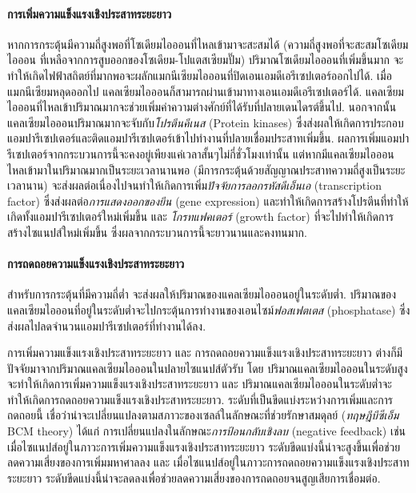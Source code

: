 {\begin{shaded}
\paragraph{\small การเพิ่มความแข็งแรงเชิงประสาทระยะยาว}
หากการกระตุ้นมีความถี่สูงพอที่โซเดียมไอออนที่ไหลเข้ามาจะสะสมได้ (ความถี่สูงพอที่จะสะสมโซเดียมไอออน ที่เหลือจากการสูบออกของโซเดียม-โปแตสเซียมปั๊ม)
ปริมาณโซเดียมไอออนที่เพิ่มขึ้นมาก จะทำให้เกิดไฟฟ้าสถิตย์ที่มากพอจะผลักแมกนีเซียมไอออนที่ปิดเอนเอมดีเอรีเซปเตอร์ออกไปได้.
เมื่อแมกนีเซียมหลุดออกไป แคลเซียมไอออนก็สามารถผ่านเข้ามาทางเอนเอมดีเอรีเซปเตอร์ได้.
แคลเซียมไอออนที่ไหลเข้าปริมาณมากจะช่วยเพิ่มค่าความต่างศักย์ที่ได้รับที่ปลายเดนไดรต์ขึ้นไป.
นอกจากนั้นแคลเซียมไอออนปริมาณมากจะจับกับ\textit{โปรตีนคีเนส} (Protein kinases) ซึ่งส่งผลให้เกิดการประกอบแอมปารีเซปเตอร์และติดแอมปารีเซปเตอร์เข้าไปทำงานที่ปลายเชื่อมประสาทเพิ่มขึ้น.
ผลการเพิ่มแอมปารีเซปเตอร์จากกระบวนการนี้จะคงอยู่เพียงแค่เวลาสั้นๆไม่กี่ชั่วโมงเท่านั้น
แต่หากมีแคลเซียมไอออนไหลเข้ามาในปริมาณมากเป็นระยะเวลานานพอ (มีการกระตุ้นด้วยสัญญาณประสาทความถี่สูงเป็นระยะเวลานาน) จะส่งผลต่อเนื่องไปจนทำให้เกิดการเพิ่ม\textit{ปัจจัยการลอกรหัสดีเอ็นเอ} (transcription factor) ซึ่งส่งผลต่อ\textit{การแสดงออกของยีน} (gene expression) และทำให้เกิดการสร้างโปรตีนที่ทำให้เกิดทั้งแอมปารีเซปเตอร์ใหม่เพิ่มขึ้น และ \textit{โกรทแฟคเตอร์} (growth factor) ที่จะไปทำให้เกิดการสร้างไซแนปส์ใหม่เพิ่มขึ้น ซึ่งผลจากกระบวนการนี้จะยาวนานและคงทนมาก.

\paragraph{\small การถดถอยความแข็งแรงเชิงประสาทระยะยาว}
สำหรับการกระตุ้นที่มีความถี่ต่ำ จะส่งผลให้ปริมาณของแคลเซียมไอออนอยู่ในระดับต่ำ.
ปริมาณของแคลเซียมไอออนที่อยู่ในระดับต่ำจะไปกระตุ้นการทำงานของเอนไซม์\textit{ฟอสเฟตเตส} (phosphatase)
ซึ่งส่งผลไปลดจำนวนแอมปารีเซปเตอร์ที่ทำงานได้ลง.

การเพิ่มความแข็งแรงเชิงประสาทระยะยาว และ การถดถอยความแข็งแรงเชิงประสาทระยะยาว ต่างก็มีปัจจัยมาจากปริมาณแคลเซียมไอออนในปลายไซแนปส์ตัวรับ
โดย ปริมาณแคลเซียมไอออนในระดับสูงจะทำให้เกิดการเพิ่มความแข็งแรงเชิงประสาทระยะยาว
และ ปริมาณแคลเซียมไอออนในระดับต่ำจะทำให้เกิดการถดถอยความแข็งแรงเชิงประสาทระยะยาว.
%
ระดับที่เป็นขีดแบ่งระหว่างการเพิ่มและการถดถอยนี้
เชื่อว่าน่าจะเปลี่ยนแปลงตามสภาวะของเซลล์ในลักษณะที่ช่วยรักษาสมดุลย์
(\textit{ทฤษฎีบีซีเอ็ม} BCM theory\cite{BCM1982})
ได้แก่
การเปลี่ยนแปลงในลักษณะ\textit{การป้อนกลับเชิงลบ} (negative feedback)
เช่น
เมื่อไซแนปส์อยู่ในภาวะการเพิ่มความแข็งแรงเชิงประสาทระยะยาว ระดับขีดแบ่งนี้น่าจะสูงขึ้นเพื่อช่วยลดความเสี่ยงของการเพิ่มมหาศาลลง
และ เมื่อไซแนปส์อยู่ในภาวะการถดถอยความแข็งแรงเชิงประสาทระยะยาว ระดับขีดแบ่งนี้น่าจะลดลงเพื่อช่วยลดความเสี่ยงของการถดถอยจนสูญเสียการเชื่อมต่อ.


\end{shaded}}
